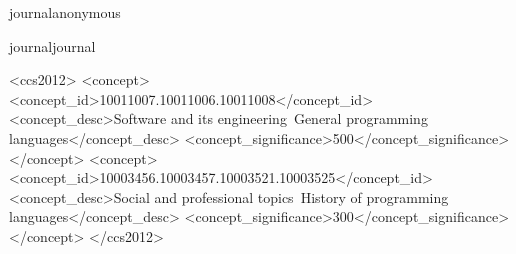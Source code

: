 \documentclass[acmsmall,screen,review]{acmart}
\def\acmversionanonymous{anonymous}
\def\acmversionjournal{journal}
\def\acmversion{anonymous}
\def\acmversion{journal}
\begin{document}
\ifx\acmversion\acmversionanonymous
  \renewcommand\footnotetextcopyrightpermission[1]{} %
\fi

\ifx\acmversion\acmversionjournal
  \begin{CCSXML}
    <ccs2012>
    <concept>
    <concept_id>10011007.10011006.10011008</concept_id>
    <concept_desc>Software and its engineering~General programming languages</concept_desc>
    <concept_significance>500</concept_significance>
    </concept>
    <concept>
    <concept_id>10003456.10003457.10003521.10003525</concept_id>
    <concept_desc>Social and professional topics~History of programming languages</concept_desc>
    <concept_significance>300</concept_significance>
    </concept>
    </ccs2012>
  \end{CCSXML}


\fi

\maketitle
\end{document}
